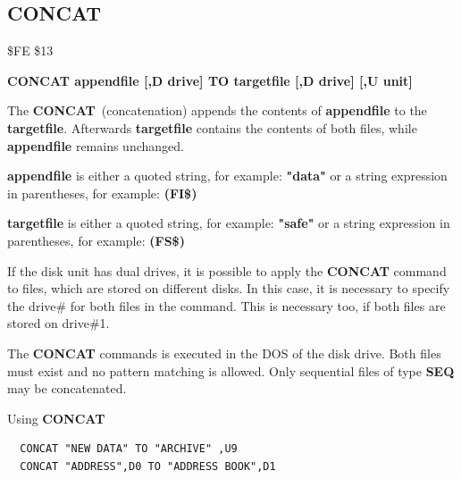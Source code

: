 \subsection{CONCAT}
\begin{description}[leftmargin=2cm,style=nextline]
\item [Token:] \$FE \$13
\item [Format:] {\bf CONCAT appendfile [,D drive] TO
                targetfile [,D drive] [,U unit] }
\item [Usage:]
   The {\bf CONCAT} (concatenation) appends the contents of
   {\bf appendfile} to the {\bf targetfile}. Afterwards {\bf targetfile}
   contains the contents of both files, while {\bf appendfile}
   remains unchanged.

   {\bf appendfile} is either a quoted string, for example: {\bf "data"} or
   a string expression in parentheses, for example: {\bf (FI\$)}

   {\bf targetfile} is either a quoted string, for example: {\bf "safe"} or
   a string expression in parentheses, for example: {\bf (FS\$)}

   If the disk unit has dual drives, it is possible to apply
   the {\bf CONCAT} command to files, which are stored on different
   disks. In this case, it is necessary to specify the drive\#
   for both files in the command. This is necessary too, if both
   files are stored on drive\#1.

   \drivedefinition

   \unitdefinition

\item [Remarks:]
   The {\bf CONCAT} commands is executed in the DOS of the disk drive.
   Both files must exist and no pattern matching is allowed.
   Only sequential files of type {\bf SEQ} may be concatenated.

\item [Example:] Using {\bf CONCAT}
\begin{tcolorbox}[colback=black,coltext=white]
\verbatimfont{\codefont}
\begin{verbatim}
  CONCAT "NEW DATA" TO "ARCHIVE" ,U9
  CONCAT "ADDRESS",D0 TO "ADDRESS BOOK",D1
\end{verbatim}
\end{tcolorbox}
\end{description}


\newpage
